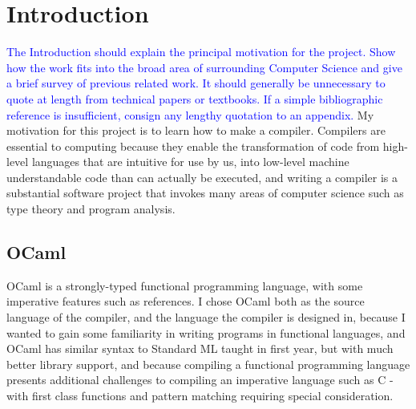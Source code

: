 \documentclass[12pt,twoside,notitlepage]{report}
\newcommand\note[1]{\textcolor{blue}{#1}}
\begin{document}
\chapter{Introduction}
\note{The Introduction should explain the principal motivation for the project. Show how the work fits into the broad area of surrounding Computer Science and give a brief survey of previous related work. It should generally be unnecessary to quote at length from technical papers or textbooks. If a simple bibliographic reference is insufficient, consign any lengthy quotation to an appendix.}
My motivation for this project is to learn how to make a compiler. Compilers are essential to computing because they enable the transformation of code from high-level languages that are intuitive for use by us, into low-level machine understandable code than can actually be executed, and writing a compiler is a substantial software project that invokes many areas of computer science such as type theory and program analysis.


\section{OCaml}
OCaml\cite{OCaml} is a strongly-typed functional programming language, with some imperative features such as references. I chose OCaml both as the source language of the compiler, and the language the compiler is designed in, because I wanted to gain some familiarity in writing programs in functional languages, and OCaml has similar syntax to Standard ML taught in first year, but with much better library support, and because compiling a functional programming language presents additional challenges to compiling an imperative language such as C - with first class functions and pattern matching requiring special consideration.
\end{document}

